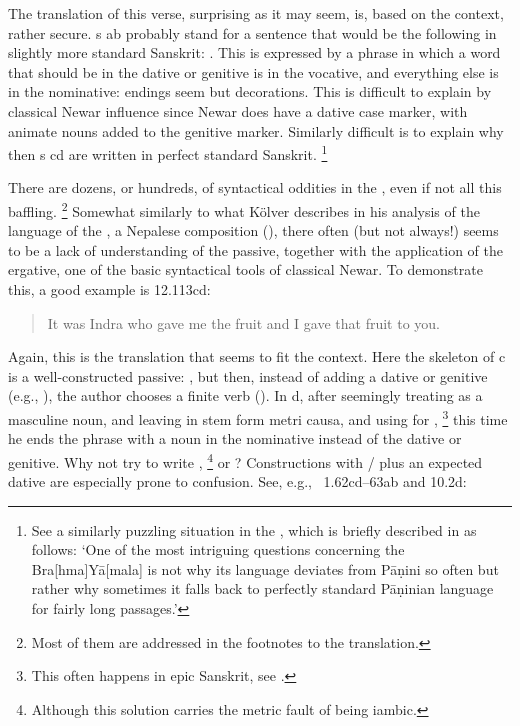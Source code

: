 \noindent            
The translation of this verse, surprising as it may seem, is, based on the
context, rather secure. s ab probably stand for a sentence that would
be the following in slightly more standard Sanskrit:
.
This is expressed by a phrase in which a word that should be 
in the dative or genitive  is in the vocative, and  
everything else is in the nominative: endings seem but
decorations. This is difficult to explain by classical Newar influence since Newar
does have a dative case marker, with animate nouns added to the genitive
marker. Similarly difficult is to explain why then s cd
are written in perfect standard Sanskrit.%
		\footnote{See a similarly puzzling situation in the \BraYa, 
						which is briefly described in  as follows:
		`One of the most intriguing questions concerning the Bra[hma]Yā[mala] 
		is not why its language deviates from Pāṇini so often 
		but rather why sometimes it falls back to perfectly standard 
		Pāṇinian language for fairly long passages.'}

There are dozens, or hundreds, of syntactical oddities in the \VSS,
even if not all this baffling.%
		\footnote{Most of them are addressed in the footnotes 
									to the translation.}
Somewhat similarly to what Kölver describes in 
his analysis of the language of the \SvayP, a Nepalese composition (),
there often (but not always!) seems to be a lack of understanding of the
passive, together with the application of the ergative, one of the
basic syntactical tools of classical Newar. To demonstrate this, a good 
example is 12.113cd:

\begin{quote}

It was Indra who gave me the fruit and I gave that fruit to you.
\end{quote}

\noindent
Again, this is the translation that seems to fit the context. 
Here the skeleton of  c is a well-constructed passive:
, but then, instead of adding a dative or 
genitive (e.g., ), the author chooses 
a finite verb (). In  d, after seemingly 
treating  as a masculine noun, and leaving
 in stem form metri causa, and using  for ,%
		\footnote{This often happens in epic Sanskrit, see 
			.}
this time he ends the phrase with a noun in the nominative  instead of
the dative or genitive. Why not try to write ,%
		\footnote{Although this solution carries the metric fault of 
								being iambic.}
or ?
\label{kathita}Constructions with / plus an expected dative 
are especially prone to confusion. See, e.g., \VSS\ 1.62cd--63ab and 
10.2d:

